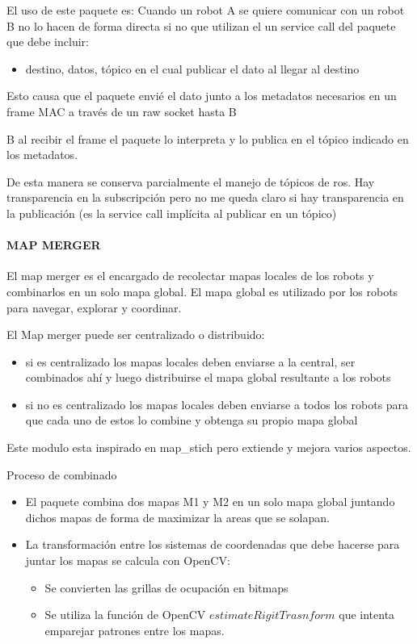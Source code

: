 El uso de este paquete es:
Cuando un robot A se quiere comunicar con un robot B no lo hacen de forma directa si no que utilizan el un service call del paquete que debe incluir:
\begin{itemize}
  \item destino, datos, tópico en el cual publicar el dato al llegar al destino
\end{itemize}

Esto causa que el paquete envié el dato junto a los metadatos necesarios en un frame MAC a través de un raw socket hasta B

B al recibir el frame el paquete lo interpreta y lo publica en el tópico indicado en los metadatos.

De esta manera se conserva parcialmente el manejo de tópicos de ros. Hay transparencia en la subscripción pero no me queda claro si hay transparencia en la publicación (es la service call implícita al publicar en un tópico)

\paragraph{MAP MERGER}

El map merger es el encargado de recolectar mapas locales de los robots y combinarlos en un solo mapa global. El mapa global es utilizado por los robots para navegar, explorar y coordinar.

El Map merger puede ser centralizado o distribuido:
\begin{itemize}
\item si es centralizado los mapas locales deben enviarse a la central, ser combinados ahí y luego distribuirse el mapa global resultante a los robots
\item si no es centralizado los mapas locales deben enviarse a todos los robots para que cada uno de estos lo combine y obtenga su propio mapa global
\end{itemize}

Este modulo esta inspirado en map\_stich pero extiende y mejora varios aspectos.

Proceso de combinado
\begin{itemize}
  \item El paquete combina dos mapas M1 y M2 en un solo mapa global juntando dichos mapas de forma de maximizar la areas que se solapan.

  \item La transformación entre los sistemas de coordenadas que debe hacerse para juntar los mapas se calcula con OpenCV:
  \begin{itemize}
    \item Se convierten las grillas de ocupación en bitmaps
    \item Se utiliza la función de OpenCV $estimateRigitTrasnform$ que intenta emparejar patrones entre los mapas.
  \end{itemize}
\end{itemize}

